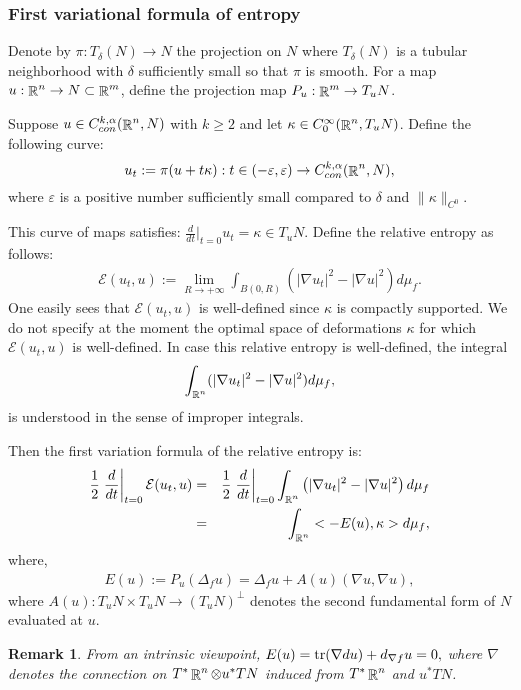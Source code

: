 \documentclass[a4paper,11pt,reqno]{amsart}
\newtheorem{rk}[defn]{Remark}
\def\tr{\mathop{\rm tr}\nolimits}
\def\tr{\mathop{\rm tr}\nolimits}
\def\R{\mathop{\rm \mathbb{R}}\nolimits}
\newcommand{\Ent}{\mathcal{E}}
\begin{document}
\subsubsection{First variational formula of entropy}
Denote by $\pi:T_{\delta}(N)\rightarrow N$ the projection on $N$ where $T_{\delta}(N)$ is a tubular neighborhood with $\delta$ sufficiently small so that $\pi$ is smooth. For a map $u:\R^n\rightarrow N\subset\R^m$, define the projection map $P_u:\R^m\rightarrow T_uN$.

Suppose $u\in C_{con}^{k,\alpha}(\R^n,N)$ with $k\geq 2$ and let $\kappa\in C_0^{\infty}(\R^n,T_uN)$. Define the following curve: $$u_t:=\pi(u+t\kappa):t\in (-\varepsilon,\varepsilon)\rightarrow C_{con}^{k,\alpha}(\R^n,N),$$ where $\varepsilon$ is a positive number sufficiently small compared to $\delta$ and $\|\kappa\|_{C^0}$. 

This curve of maps satisfies: $\frac{d}{dt}|_{t=0}u_t=\kappa\in T_uN$.
Define the relative entropy as follows:
\begin{eqnarray*}
\Ent(u_t,u):=\lim_{R\rightarrow+\infty}\int_{B(0,R)}(|\nabla u_t|^2-|\nabla u|^2)d\mu_f.
\end{eqnarray*}
One easily sees that $\Ent(u_t,u)$ is well-defined since $\kappa$ is compactly supported. We do not specify at the moment the optimal space of deformations $\kappa$ for which $\Ent(u_t,u)$ is well-defined. In case this relative entropy is well-defined, the integral $$\int_{\R^n}(|\nabla u_t|^2-|\nabla u|^2)d\mu_f,$$ is understood in the sense of improper integrals.

Then the first variation formula of the relative entropy is:
\begin{eqnarray*}
\frac{1}{2}\left.\frac{d}{dt}\right|_{t=0}\Ent(u_t,u)&=&\frac{1}{2}\left.\frac{d}{dt}\right|_{t=0}\int_{\R^n}\left(|\nabla u_t|^2-|\nabla u|^2\right)d\mu_f\\
&=&\int_{\R^n}<-E(u),\kappa>d\mu_f,
\end{eqnarray*}
where,
\begin{eqnarray*}
E(u):=P_u(\Delta_fu)=\Delta_fu+A(u)(\nabla u,\nabla u),
\end{eqnarray*}
where $A(u):T_uN\times T_uN\rightarrow (T_uN)^{\perp}$ denotes the second fundamental form of $N$ evaluated at $u$.
\begin{rk}
From an intrinsic viewpoint, $E(u)=\tr(\nabla du)+d_{\nabla f}u=0,$
where $\nabla$ denotes the connection on $T^*\R^n\otimes u^*TN$ induced from  $T^*\R^n$ and $u^*TN$. \end{rk}
\end{document}
